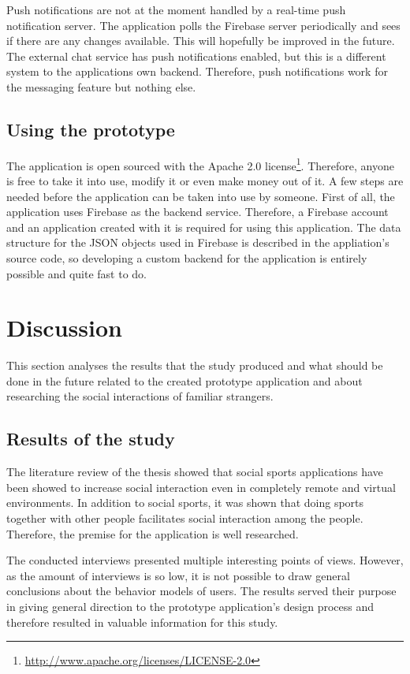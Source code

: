Push notifications are not at the moment handled by a real-time push notification server. The application polls the Firebase server periodically and sees if there are any changes available. This will hopefully be improved in the future. The external chat service has push notifications enabled, but this is a different system to the applications own backend. Therefore, push notifications work for the messaging feature but nothing else.

\subsection{Using the prototype}

The application is open sourced with the Apache 2.0 license\footnote{\url{http://www.apache.org/licenses/LICENSE-2.0}}. Therefore, anyone is free to take it into use, modify it or even make money out of it. A few steps are needed before the application can be taken into use by someone. First of all, the application uses Firebase as the backend service. Therefore, a Firebase account and an application created with it is required for using this application. The data structure for the JSON objects used in Firebase is described in the appliation's source code, so developing a custom backend for the application is entirely possible and quite fast to do.
\clearpage
\section{Discussion}

This section analyses the results that the study produced and what should be done in the future related to the created prototype application and about researching the social interactions of familiar strangers.

\subsection{Results of the study}

The literature review of the thesis showed that social sports applications have been showed to increase social interaction even in completely remote and virtual environments. In addition to social sports, it was shown that doing sports together with other people facilitates social interaction among the people. Therefore, the premise for the application  is well researched.

The conducted interviews presented multiple interesting points of views. However, as the amount of interviews is so low, it is not possible to draw general conclusions about the behavior models of users. The results served their purpose in giving general direction to the prototype application's design process and therefore resulted in valuable information for this study.


